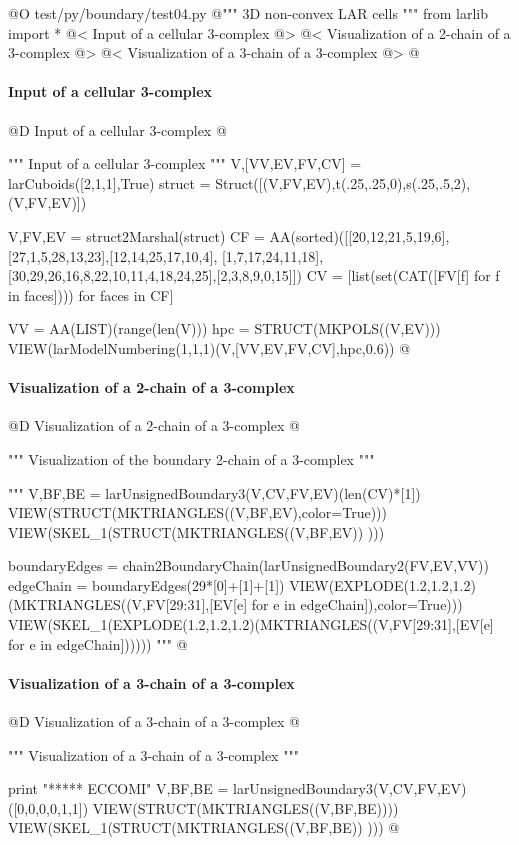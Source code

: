 \documentclass[11pt,oneside]{article}    %
\begin{document}
@O test/py/boundary/test04.py
@{""" 3D non-convex LAR cells """
from larlib import *
@< Input of a cellular 3-complex @>
@< Visualization of a 2-chain of a 3-complex @>
@< Visualization of a 3-chain of a 3-complex @>
@}

\paragraph{Input of a cellular 3-complex}
@D Input of a cellular 3-complex
@{""" Input of a cellular 3-complex """
V,[VV,EV,FV,CV] = larCuboids([2,1,1],True)
struct = Struct([(V,FV,EV),t(.25,.25,0),s(.25,.5,2),(V,FV,EV)])

V,FV,EV = struct2Marshal(struct)
CF = AA(sorted)([[20,12,21,5,19,6],[27,1,5,28,13,23],[12,14,25,17,10,4],
[1,7,17,24,11,18],[30,29,26,16,8,22,10,11,4,18,24,25],[2,3,8,9,0,15]])
CV = [list(set(CAT([FV[f]  for f in faces]))) for faces in CF]

VV = AA(LIST)(range(len(V)))
hpc = STRUCT(MKPOLS((V,EV)))
VIEW(larModelNumbering(1,1,1)(V,[VV,EV,FV,CV],hpc,0.6))
@}


\paragraph{Visualization of a 2-chain of a 3-complex}
@D Visualization of a 2-chain of a 3-complex
@{""" Visualization of the boundary 2-chain of a 3-complex """

"""
V,BF,BE = larUnsignedBoundary3(V,CV,FV,EV)(len(CV)*[1])
VIEW(STRUCT(MKTRIANGLES((V,BF,EV),color=True)))
VIEW(SKEL_1(STRUCT(MKTRIANGLES((V,BF,EV)) )))

boundaryEdges = chain2BoundaryChain(larUnsignedBoundary2(FV,EV,VV))
edgeChain = boundaryEdges(29*[0]+[1]+[1]) 
VIEW(EXPLODE(1.2,1.2,1.2)(MKTRIANGLES((V,FV[29:31],[EV[e] for e in edgeChain]),color=True)))
VIEW(SKEL_1(EXPLODE(1.2,1.2,1.2)(MKTRIANGLES((V,FV[29:31],[EV[e] for e in edgeChain])))))
"""
@}

\paragraph{Visualization of a 3-chain of a 3-complex}
@D Visualization of a 3-chain of a 3-complex
@{""" Visualization of a 3-chain of a 3-complex """

print "\n****** ECCOMI"
V,BF,BE = larUnsignedBoundary3(V,CV,FV,EV)([0,0,0,0,1,1])
VIEW(STRUCT(MKTRIANGLES((V,BF,BE))))
VIEW(SKEL_1(STRUCT(MKTRIANGLES((V,BF,BE)) )))
@}
\end{document}
